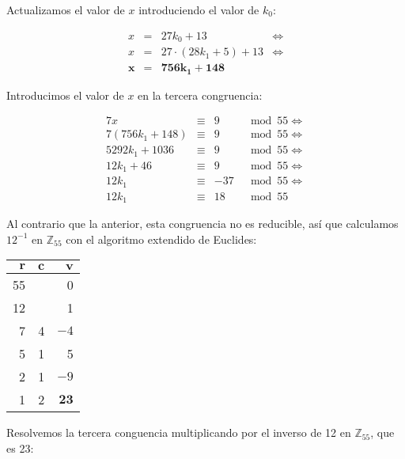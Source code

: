 Actualizamos el valor de $x$ introduciendo el valor de $k_0$:

\[
\begin{array}{rcll}
	x              & =              & 27k_0 + 13                & \iff \\
	x              & =              & 27 \cdot (28k_1 + 5) + 13 & \iff \\
	\boldsymbol{x} & \boldsymbol{=} & \boldsymbol{756k_1 + 148}
\end{array}
\]

Introducimos el valor de $x$ en la tercera congruencia:

\[
\begin{array}{rcrl}
	7x              & \equiv & 9   & \mod 55 \iff \\
	7(756k_1 + 148) & \equiv & 9   & \mod 55 \iff \\
	5292k_1 + 1036  & \equiv & 9   & \mod 55 \iff \\
	12k_1 + 46      & \equiv & 9   & \mod 55 \iff \\
	12k_1           & \equiv & -37 & \mod 55 \iff \\
	12k_1           & \equiv & 18  & \mod 55
\end{array}
\]

Al contrario que la anterior, esta congruencia no es reducible, así que calculamos $12^{-1}$ en $\mathbb{Z}_{55}$ con el algoritmo extendido de Euclides:

\begin{center}
\begin{tabular}{r r r}
	$\boldsymbol{r}$ & $\boldsymbol{c}$ & $\boldsymbol{v}$  \\
	\toprule
	55               &                  & 0                 \\
	12               &                  & 1                 \\
	7                & 4                & $-4$              \\
	5                & 1                & 5                 \\
	2                & 1                & $-9$              \\
	1                & 2                & $\boldsymbol{23}$ \\
\end{tabular}
\end{center}

Resolvemos la tercera conguencia multiplicando por el inverso de 12 en $\mathbb{Z}_{55}$, que es 23:

